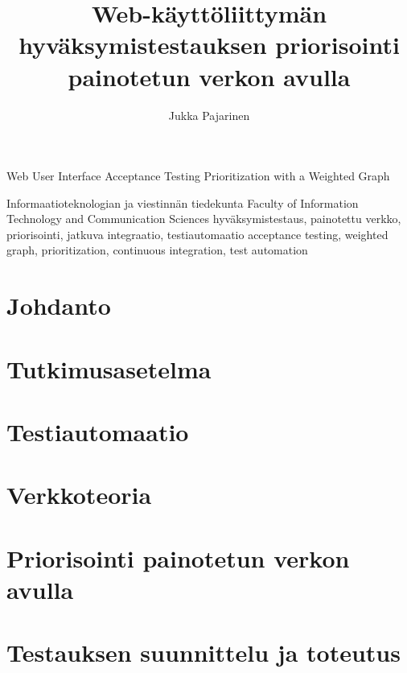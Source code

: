 \documentclass[finnish, authoryear]{config/tauthesis}
\theoremstyle{definition}
\begin{document}
\frontmatter
\title
  {Web-käyttöliittymän hyväksymistestauksen priorisointi painotetun verkon avulla}
  {Web User Interface Acceptance Testing Prioritization with a Weighted Graph}
\subtitle{}{}
\author{Jukka Pajarinen}
\facultyname
  {Informaatioteknologian ja viestinnän tiedekunta}
  {Faculty of Information Technology and Communication Sciences}
\keywords
  {hyväksymistestaus, painotettu verkko, priorisointi, jatkuva integraatio, testiautomaatio}
  {acceptance testing, weighted graph, prioritization, continuous integration, test automation}
\maketitle
{}
\tableofcontents
\listoffigures
\listoftables
\glossary

\mainmatter
\chapter{Johdanto}
\label{ch:johdanto}

\chapter{Tutkimusasetelma}
\label{ch:tutkimusasetelma}

\chapter{Testiautomaatio}
\label{ch:testiautomaatio}

\chapter{Verkkoteoria}
\label{ch:verkkoteoria}

\chapter{Priorisointi painotetun verkon avulla}
\label{ch:testitapauksien_priorisointi}

\chapter{Testauksen suunnittelu ja toteutus}
\label{ch:testauksen_suunnittelu_ja_toteutus}

\end{document}
